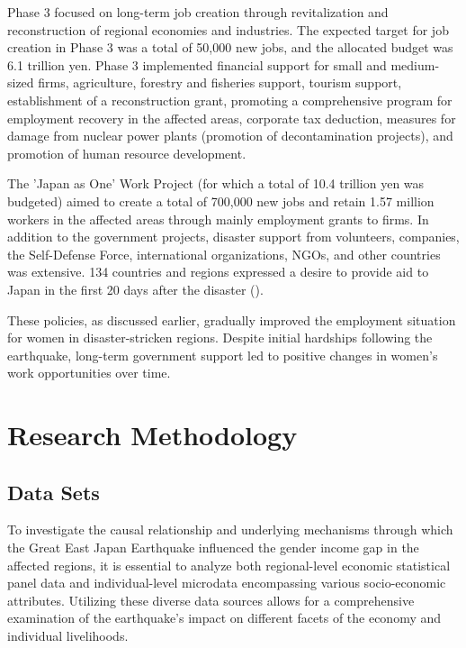 \documentclass[a4paper,12pt]{article}
\begin{document}
Phase 3 focused on long-term job creation through revitalization and reconstruction of regional economies and industries. The expected target for job creation in Phase 3 was a total of 50,000 new jobs, and the allocated budget was 6.1 trillion yen. Phase 3 implemented financial support for small and medium-sized firms, agriculture, forestry and fisheries support, tourism support, establishment of a reconstruction grant, promoting a comprehensive program for employment recovery in the affected areas, corporate tax deduction, measures for damage from nuclear power plants (promotion of decontamination projects), and promotion of human resource development.

The 'Japan as One' Work Project (for which a total of 10.4 trillion yen was budgeted) aimed to create a total of 700,000 new jobs and retain 1.57 million workers in the affected areas through mainly employment grants to firms. In addition to the government projects, disaster support from volunteers, companies, the Self-Defense Force, international organizations, NGOs, and other countries was extensive. 134 countries and regions expressed a desire to provide aid to Japan in the first 20 days after the disaster (\citet{Norio2011TheComments}).

These policies, as discussed earlier, gradually improved the employment situation for women in disaster-stricken regions. Despite initial hardships following the earthquake, long-term government support led to positive changes in women's work opportunities over time.



\section{Research Methodology}

\subsection{Data Sets}

To investigate the causal relationship and underlying mechanisms through which the Great East Japan Earthquake influenced the gender income gap in the affected regions, it is essential to analyze both regional-level economic statistical panel data and individual-level microdata encompassing various socio-economic attributes. Utilizing these diverse data sources allows for a comprehensive examination of the earthquake's impact on different facets of the economy and individual livelihoods.
\end{document}
